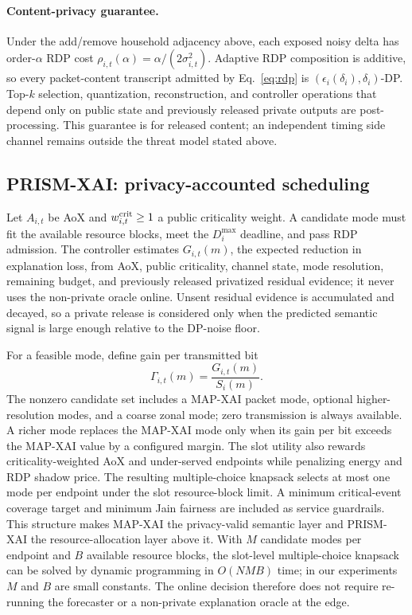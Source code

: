 \documentclass[conference]{IEEEtran}
\newcommand{\method}{PRISM-XAI}
\newcommand{\mapxai}{MAP-XAI}
\begin{document}
\paragraph{Content-privacy guarantee.}
Under the add/remove household adjacency above, each exposed noisy delta
has order-$\alpha$ RDP cost $\rho_{i,t}(\alpha)=\alpha/(2\sigma_{i,t}^2)$.
Adaptive RDP composition is additive, so every packet-content transcript
admitted by Eq.~\eqref{eq:rdp} is $(\epsilon_i(\delta_i),\delta_i)$-DP.
Top-$k$ selection, quantization, reconstruction, and controller operations
that depend only on public state and previously released private outputs
are post-processing. This guarantee is for released content; an independent
timing side channel remains outside the threat model stated above.

\subsection{PRISM-XAI: privacy-accounted scheduling}

Let $A_{i,t}$ be AoX and $w^{\rm crit}_{i,t}\geq 1$ a public
criticality weight. A candidate mode must fit the available resource
blocks, meet the $D_i^{\max}$ deadline, and pass RDP admission. The
controller estimates $G_{i,t}(m)$, the expected reduction in explanation
loss, from AoX, public criticality, channel state, mode resolution,
remaining budget, and previously released privatized residual evidence;
it never uses the non-private oracle online. Unsent residual evidence is
accumulated and decayed, so a private release is considered only when the
predicted semantic signal is large enough relative to the DP-noise floor.

For a feasible mode, define gain per transmitted bit
\begin{equation}
\Gamma_{i,t}(m)=\frac{G_{i,t}(m)}{S_i(m)}.
\label{eq:gainbit}
\end{equation}
The nonzero candidate set includes a \mapxai{} packet mode, optional
higher-resolution modes, and a coarse zonal mode; zero transmission is
always available. A richer mode replaces the \mapxai{} mode only when
its gain per bit exceeds the \mapxai{} value by a configured margin. The
slot utility also rewards criticality-weighted AoX and under-served
endpoints while penalizing energy and RDP shadow price. The resulting
multiple-choice knapsack selects at most one mode per endpoint under the
slot resource-block limit. A minimum critical-event coverage target and
minimum Jain fairness are included as service guardrails. This structure
makes \mapxai{} the privacy-valid semantic layer and \method{} the
resource-allocation layer above it. With $M$ candidate modes per endpoint
and $B$ available resource blocks, the slot-level multiple-choice knapsack
can be solved by dynamic programming in $O(NMB)$ time; in our experiments
$M$ and $B$ are small constants. The online decision therefore does not
require re-running the forecaster or a non-private explanation oracle at
the edge.
\end{document}
